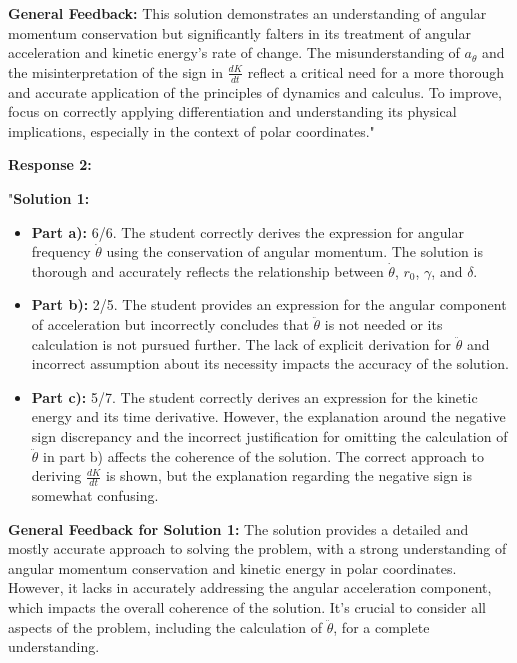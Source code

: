 \documentclass[a4paper,11pt]{article}
\begin{document}
\textbf{General Feedback:} This solution demonstrates an understanding of angular momentum conservation but significantly falters in its treatment of angular acceleration and kinetic energy's rate of change. The misunderstanding of \( a_{\theta} \) and the misinterpretation of the sign in \( \frac{dK}{dt} \) reflect a critical need for a more thorough and accurate application of the principles of dynamics and calculus. To improve, focus on correctly applying differentiation and understanding its physical implications, especially in the context of polar coordinates."

\textbf{Response 2:}

"\textbf{Solution 1:}

\begin{itemize}
    \item \textbf{Part a):} 6/6. The student correctly derives the expression for angular frequency \(\dot{\theta}\) using the conservation of angular momentum. The solution is thorough and accurately reflects the relationship between \(\dot{\theta}\), \(r_0\), \(\gamma\), and \(\delta\).
    
    \item \textbf{Part b):} 2/5. The student provides an expression for the angular component of acceleration but incorrectly concludes that \(\ddot{\theta}\) is not needed or its calculation is not pursued further. The lack of explicit derivation for \(\ddot{\theta}\) and incorrect assumption about its necessity impacts the accuracy of the solution.
    
    \item \textbf{Part c):} 5/7. The student correctly derives an expression for the kinetic energy and its time derivative. However, the explanation around the negative sign discrepancy and the incorrect justification for omitting the calculation of \(\ddot{\theta}\) in part b) affects the coherence of the solution. The correct approach to deriving \(\frac{dK}{dt}\) is shown, but the explanation regarding the negative sign is somewhat confusing.
\end{itemize}

\textbf{General Feedback for Solution 1:} The solution provides a detailed and mostly accurate approach to solving the problem, with a strong understanding of angular momentum conservation and kinetic energy in polar coordinates. However, it lacks in accurately addressing the angular acceleration component, which impacts the overall coherence of the solution. It's crucial to consider all aspects of the problem, including the calculation of \(\ddot{\theta}\), for a complete understanding.
\end{document}
